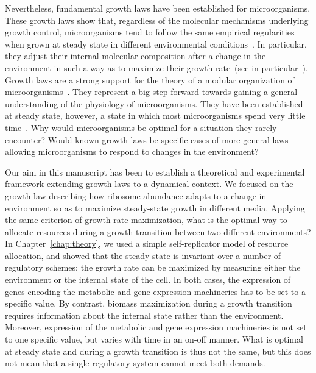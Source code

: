 Nevertheless, fundamental growth laws have been established for microorganisms.
These growth laws show that, regardless of the molecular mechanisms underlying growth control, microorganisms tend to follow the same empirical regularities when grown at steady state in different environmental conditions~\cite{molenaar_shifts_2009,scott_emergence_2014,scott_interdependence_2010,scott_bacterial_2011}.
In particular, they adjust their internal molecular composition after a change in the environment in such a way as to maximize their growth rate~(see in particular~\cite{molenaar_shifts_2009,scott_emergence_2014}).
Growth laws are a strong support for the theory of a modular organization of microorganisms~\cite{scott_emergence_2014,hartwell_molecular_1999,arkin_fast_2006,guido_bottom-up_2006}.
They represent a big step forward towards gaining a general understanding of the physiology of microorganisms.
They have been established at steady state, however, a state in which most microorganisms spend very little time~\cite{mcarthur_microbial_2006,menge_nitrogen_2012,
hobbie_microbes_2013,savageau_escherichia_1983,
savageau_demand_1998,blount_unexhausted_2015,vanelsas_survival_2011}.
Why would microorganisms be optimal for a situation they rarely encounter?
Would known growth laws be specific cases of more general laws allowing microorganisms to respond to changes in the environment?

Our aim in this manuscript has been to establish a theoretical and experimental framework extending growth laws to a dynamical context.
We focused on the growth law describing how ribosome abundance adapts to a change in environment so as to maximize steady-state growth in different media.
Applying the same criterion of growth rate maximization, what is the optimal way to allocate resources during a growth transition between two different environments?
In Chapter~\ref{chap:theory}, we used a simple self-replicator model of resource allocation, and showed that the steady state is invariant over a number of regulatory schemes: the growth rate can be maximized by measuring either the environment or the internal state of the cell.
In both cases, the expression of genes encoding the metabolic and gene expression machineries has to be set to a specific value.
By contrast, biomass maximization during a growth transition requires information about the internal state rather than the environment.
Moreover, expression of the metabolic and gene expression machineries is not set to one specific value, but varies with time in an on-off manner.
What is optimal at steady state and during a growth transition is thus not the same, but this does not mean that a single regulatory system cannot meet both demands.

